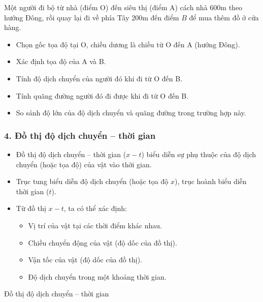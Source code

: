 \begin{hoatdong}
Một người đi bộ từ nhà (điểm O) đến siêu thị (điểm A) cách nhà $600 \text{m}$ theo hướng Đông, rồi quay lại đi về phía Tây $200 \text{m}$ đến điểm $B$ để mua thêm đồ ở cửa hàng.
\begin{itemize}
    \item Chọn gốc tọa độ tại O, chiều dương là chiều từ O đến A (hướng Đông).
    \item Xác định tọa độ của A và B.
    \item Tính độ dịch chuyển của người đó khi đi từ O đến B.
    \item Tính quãng đường người đó đi được khi đi từ O đến B.
    \item So sánh độ lớn của độ dịch chuyển và quãng đường trong trường hợp này.
\end{itemize}
\end{hoatdong}

\subsubsection{4. Đồ thị độ dịch chuyển -- thời gian}

\begin{kienthuc}
\begin{itemize}
    \item Đồ thị độ dịch chuyển -- thời gian ($x-t$) biểu diễn sự phụ thuộc của độ dịch chuyển (hoặc tọa độ) của vật vào thời gian.
    \item Trục tung biểu diễn độ dịch chuyển (hoặc tọa độ $x$), trục hoành biểu diễn thời gian ($t$).
    \item Từ đồ thị $x-t$, ta có thể xác định:
    \begin{itemize}
        \item Vị trí của vật tại các thời điểm khác nhau.
        \item Chiều chuyển động của vật (độ dốc của đồ thị).
        \item Vận tốc của vật (độ dốc của đồ thị).
        \item Độ dịch chuyển trong một khoảng thời gian.
    \end{itemize}
\end{itemize}
\end{kienthuc}

\begin{haicotchay}{Đồ thị độ dịch chuyển -- thời gian}{
}
\end{haicotchay}

